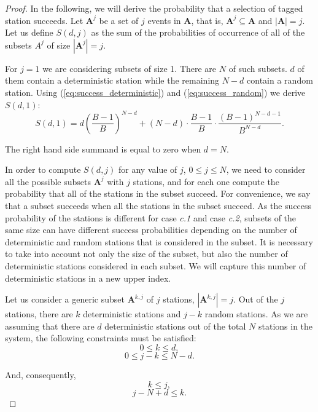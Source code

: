 \documentclass[journal]{IEEEtran}
\begin{document}
\begin{proof}
In the following, we will derive the probability that a selection of tagged station succeeds.
Let $\mathbf{A}^j$ be a set of $j$ events in $\mathbf{A}$, that is, $\mathbf{A}^j \subseteq \mathbf{A}$ and $|\mathbf{A}|=j$.
Let us define $S(d,j)$ as the sum of the probabilities of occurrence of all of the subsets $A^j$ of size $|\mathbf{A}^j|=j$.

For $j=1$ we are considering subsets of size 1.
There are $N$ of such subsets.
$d$ of them contain a deterministic station while the remaining $N-d$ contain a random station.
Using (\ref{eq:success_deterministic}) and (\ref{eq:success_random}) we derive $S(d,1)$:
\begin{equation}
S(d,1)=d \left( \frac{B-1}{B} \right)^{N-d} + (N-d)\cdot \frac{B-1}{B}\cdot \frac{(B-1)^{N-d-1}}{B^{N-d}}.
\end{equation}

The right hand side summand is equal to zero when $d=N$.

In order to compute $S(d,j)$ for any value of $j$, $0 \leq j \leq N$, we need to consider all the possible subsets $\mathbf{A}^j$ with $j$ stations, and for each one compute the probability that all of the stations in the subset succeed.
For convenience, we say that a subset succeeds when all the stations in the subset succeed.
As the success probability of the stations is different for case \emph{c.1} and case \emph{c.2}, subsets of the same size can have different success probabilities depending on the number of deterministic and random stations that is considered in the subset.
It is necessary to take into account not only the size of the subset, but also the number of deterministic stations considered in each subset.
We will capture this number of deterministic stations in a new upper index.

Let us consider a generic subset $\mathbf{A}^{k,j}$ of $j$ stations, $|\mathbf{A}^{k,j}|=j$.
Out of the $j$ stations, there are $k$ deterministic stations and $j-k$ random stations.
As we are assuming that there are $d$ deterministic stations out of the total $N$ stations in the system, the following constraints must be satisfied:
\begin{equation}
0 \leq k \leq d,
\end{equation}
\begin{equation}
0 \leq j-k \leq N -d.
\end{equation}

And, consequently,
\begin{equation}
\label{eq:ineq1}
 k \leq j,
\end{equation}
\begin{equation}
\label{eq:ineq2}
 j-N+d \leq k.
\end{equation}


\end{proof}
\end{document}
